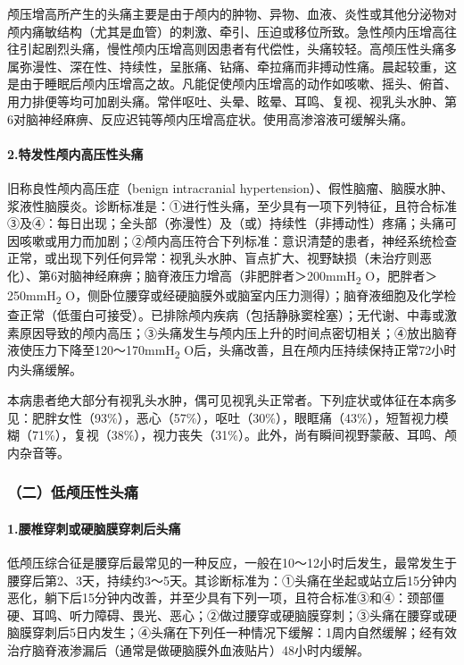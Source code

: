 颅压增高所产生的头痛主要是由于颅内的肿物、异物、血液、炎性或其他分泌物对颅内痛敏结构（尤其是血管）的刺激、牵引、压迫或移位所致。急性颅内压增高往往引起剧烈头痛，慢性颅内压增高则因患者有代偿性，头痛较轻。高颅压性头痛多属弥漫性、深在性、持续性，呈胀痛、钻痛、牵拉痛而非搏动性痛。晨起较重，这是由于睡眠后颅内压增高之故。凡能促使颅内压增高的动作如咳嗽、摇头、俯首、用力排便等均可加剧头痛。常伴呕吐、头晕、眩晕、耳鸣、复视、视乳头水肿、第6对脑神经麻痹、反应迟钝等颅内压增高症状。使用高渗溶液可缓解头痛。

\paragraph{2.特发性颅内高压性头痛}

旧称良性颅内高压症（benign intracranial
hypertension）、假性脑瘤、脑膜水肿、浆液性脑膜炎。诊断标准是：①进行性头痛，至少具有一项下列特征，且符合标准③及④：每日出现；全头部（弥漫性）及（或）持续性（非搏动性）疼痛；头痛可因咳嗽或用力而加剧；②颅内高压符合下列标准：意识清楚的患者，神经系统检查正常，或出现下列任何异常：视乳头水肿、盲点扩大、视野缺损（未治疗则恶化）、第6对脑神经麻痹；脑脊液压力增高（非肥胖者＞200mmH\textsubscript{2}
O，肥胖者＞250mmH\textsubscript{2}
O，侧卧位腰穿或经硬脑膜外或脑室内压力测得）；脑脊液细胞及化学检查正常（低蛋白可接受）。已排除颅内疾病（包括静脉窦栓塞）；无代谢、中毒或激素原因导致的颅内高压；③头痛发生与颅内压上升的时间点密切相关；④放出脑脊液使压力下降至120～170mmH\textsubscript{2}
O后，头痛改善，且在颅内压持续保持正常72小时内头痛缓解。

本病患者绝大部分有视乳头水肿，偶可见视乳头正常者。下列症状或体征在本病多见：肥胖女性（93\%），恶心（57\%），呕吐（30\%），眼眶痛（43\%），短暂视力模糊（71\%），复视（38\%），视力丧失（31\%）。此外，尚有瞬间视野蒙蔽、耳鸣、颅内杂音等。

\subsubsection{（二）低颅压性头痛}

\paragraph{1.腰椎穿刺或硬脑膜穿刺后头痛}

低颅压综合征是腰穿后最常见的一种反应，一般在10～12小时后发生，最常发生于腰穿后第2、3天，持续约3～5天。其诊断标准为：①头痛在坐起或站立后15分钟内恶化，躺下后15分钟内改善，并至少具有下列一项，且符合标准③和④：颈部僵硬、耳鸣、听力障碍、畏光、恶心；②做过腰穿或硬脑膜穿刺；③头痛在腰穿或硬脑膜穿刺后5日内发生；④头痛在下列任一种情况下缓解：1周内自然缓解；经有效治疗脑脊液渗漏后（通常是做硬脑膜外血液贴片）48小时内缓解。

